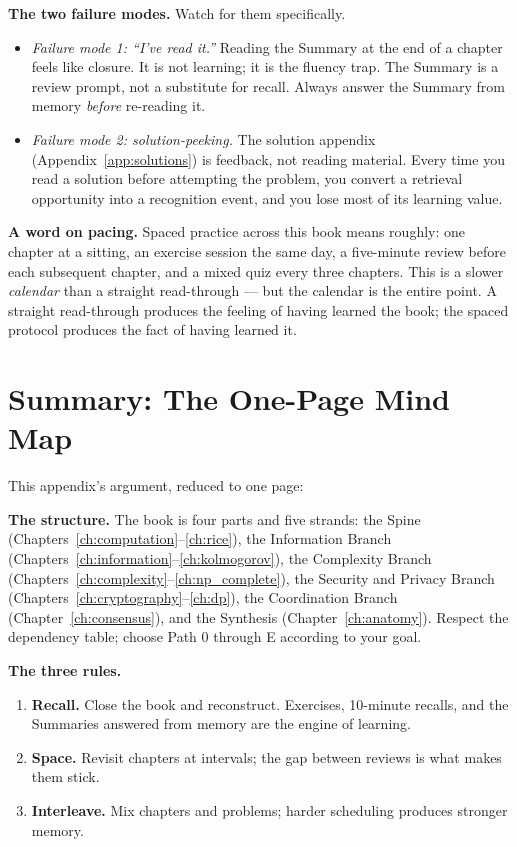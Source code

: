 \textbf{The two failure modes.} Watch for them specifically.
\begin{itemize}
\item \emph{Failure mode 1: ``I've read it.''} Reading the Summary at the end of a chapter feels like closure. It is not learning; it is the fluency trap. The Summary is a review prompt, not a substitute for recall. Always answer the Summary from memory \emph{before} re-reading it.
\item \emph{Failure mode 2: solution-peeking.} The solution appendix (Appendix~\ref{app:solutions}) is feedback, not reading material. Every time you read a solution before attempting the problem, you convert a retrieval opportunity into a recognition event, and you lose most of its learning value.
\end{itemize}

\textbf{A word on pacing.} Spaced practice across this book means roughly: one chapter at a sitting, an exercise session the same day, a five-minute review before each subsequent chapter, and a mixed quiz every three chapters. This is a slower \emph{calendar} than a straight read-through --- but the calendar is the entire point. A straight read-through produces the feeling of having learned the book; the spaced protocol produces the fact of having learned it.

\section{Summary: The One-Page Mind Map}
\label{sec:learningmap:summary}

This appendix's argument, reduced to one page: 

\textbf{The structure.} The book is four parts and five strands: the Spine (Chapters~\ref{ch:computation}--\ref{ch:rice}), the Information Branch (Chapters~\ref{ch:information}--\ref{ch:kolmogorov}), the Complexity Branch (Chapters~\ref{ch:complexity}--\ref{ch:np_complete}), the Security and Privacy Branch (Chapters~\ref{ch:cryptography}--\ref{ch:dp}), the Coordination Branch (Chapter~\ref{ch:consensus}), and the Synthesis (Chapter~\ref{ch:anatomy}). Respect the dependency table; choose Path 0 through E according to your goal.

\textbf{The three rules.}
\begin{enumerate}
\item \textbf{Recall.} Close the book and reconstruct. Exercises, 10-minute recalls, and the Summaries answered from memory are the engine of learning.
\item \textbf{Space.} Revisit chapters at intervals; the gap between reviews is what makes them stick.
\item \textbf{Interleave.} Mix chapters and problems; harder scheduling produces stronger memory.
\end{enumerate}


